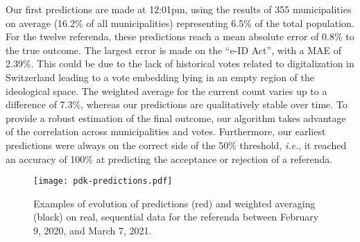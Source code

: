 Our first predictions are made at 12:01pm, using the results of 355 municipalities on average (16.2\% of all municipalities) representing 6.5\% of the total population.
For the twelve referenda, these predictions reach a mean absolute error of 0.8\% to the true outcome.
The largest error is made on the ``e-ID Act'', with a MAE of 2.39\%.
This could be due to the lack of historical votes related to digitalization in Switzerland leading to a vote embedding lying in an empty region of the ideological space.
The weighted average for the current count varies up to a difference of 7.3\%, whereas our predictions are qualitatively stable over time.
To provide a robust estimation of the final outcome, our algorithm takes advantage of the correlation across municipalities and votes.
Furthermore, our earliest predictions were always on the correct side of the 50\% threshold, \textit{i.e.}, it reached an accuracy of 100\% at predicting the acceptance or rejection of a referenda.

\begin{figure}
	\centering
	\texttt{[image: pdk-predictions.pdf]}
	\caption{
		Examples of evolution of predictions (red) and weighted averaging (black) on real, sequential data for the referenda between February 9, 2020, and March 7, 2021.
	}
	\label{pdk:fig:predictions}
\end{figure}
